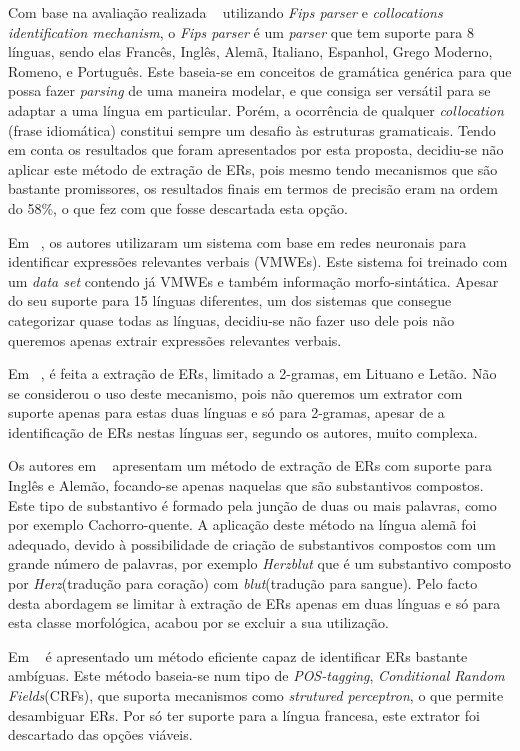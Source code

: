 Com base na avaliação realizada ~\cite{W17-1706} utilizando \textit{Fips parser} e \textit{collocations identification mechanism}, o \textit{Fips parser} é um \textit{parser} que tem suporte para 8 línguas, sendo elas Francês, Inglês, Alemã, Italiano, Espanhol, Grego Moderno, Romeno, e Português. Este baseia-se em conceitos de gramática genérica para que possa fazer \textit{parsing} de uma maneira modelar, e que consiga ser versátil para se adaptar a uma língua em particular. Porém, a ocorrência de qualquer \textit{collocation} (frase idiomática) constitui sempre um desafio às estruturas gramaticais. Tendo em conta os resultados que foram apresentados por esta proposta, decidiu-se não aplicar este método de extração de ERs, pois mesmo tendo mecanismos que são bastante promissores, os resultados finais em termos de precisão eram na ordem do 58\%, o que fez com que fosse descartada esta opção.

Em ~\cite{W17-1707}, os autores utilizaram um sistema com base em redes neuronais para identificar expressões relevantes verbais (VMWEs). Este sistema foi treinado com um \textit{data set} contendo já VMWEs e também informação morfo-sintática. Apesar do seu suporte para 15 línguas diferentes, um dos sistemas que consegue categorizar quase todas as línguas, decidiu-se não fazer uso dele pois não queremos apenas extrair expressões relevantes verbais.

Em ~\cite{W17-1712}, é feita a extração de ERs, limitado a 2-gramas, em Lituano e Letão. Não se considerou o uso deste mecanismo, pois não queremos um extrator com suporte apenas para estas duas línguas e só para 2-gramas, apesar de a identificação de ERs nestas línguas ser, segundo os autores, muito complexa.

 Os autores em ~\cite{W17-1713} apresentam um método de extração de ERs com suporte para Inglês e Alemão, focando-se apenas naquelas que são substantivos compostos. Este tipo de substantivo é formado pela junção de duas ou mais palavras, como por exemplo Cachorro-quente. A aplicação deste método na língua alemã foi adequado, devido à possibilidade de criação de substantivos compostos com um grande número de palavras, por exemplo \textit{Herzblut} que é um substantivo composto por \textit{Herz}(tradução para coração) com \textit{blut}(tradução para sangue). Pelo facto desta abordagem se limitar à extração de ERs apenas em duas línguas e só para esta classe morfológica, acabou por se excluir a sua utilização.

Em ~\cite{W17-1723} é apresentado um método eficiente capaz de identificar ERs bastante ambíguas. Este método baseia-se num tipo de \textit{POS-tagging},   \textit{Conditional Random Fields}(CRFs), que suporta mecanismos como \textit{strutured perceptron}, o que permite desambiguar ERs.
Por só ter suporte para a língua francesa, este extrator foi descartado das opções viáveis.

